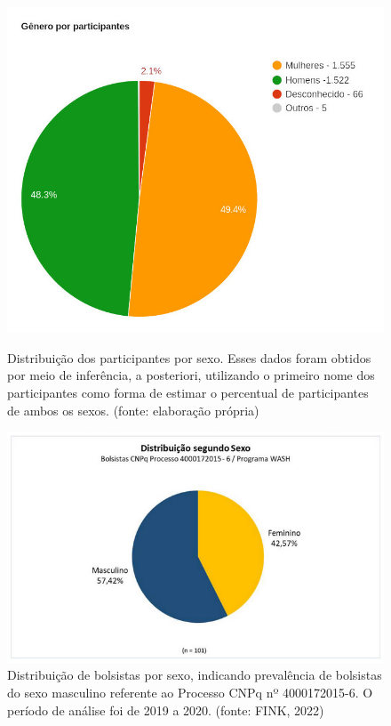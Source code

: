 \captionsetup{format=plain}
\begin{figure}[htb]

\centering


\begin{minipage}[b]{0.4\linewidth}
        \centering
                \includegraphics[width=1.0\linewidth]{../../../imagens/genero-todos-crop.jpeg}
                \caption{Distribuição dos participantes por sexo. Esses dados foram obtidos por meio de inferência, a posteriori, utilizando o primeiro nome dos participantes como forma de estimar o percentual de participantes de ambos os sexos. (fonte: elaboração própria)}
                \label{ef11d820efb73d78fb64eb6bdd03853471a8e89f}
\end{minipage}%
\hspace{0.5cm}
\begin{minipage}[b]{0.4\linewidth}
        \centering
                \includegraphics[width=1.0\linewidth]{../../../imagens/distribuicao-sexo-bolsistas.png}
                \caption{Distribuição de bolsistas por sexo, indicando prevalência de bolsistas do sexo masculino referente ao Processo CNPq  nº 4000172015-6. O período de análise foi de 2019 a 2020. (fonte: FINK, 2022)}
                \label{1164a3115bd14e3f25b6b141840652ffbd0d2374}
\end{minipage}
\hspace{0.5cm}
\end{figure}



